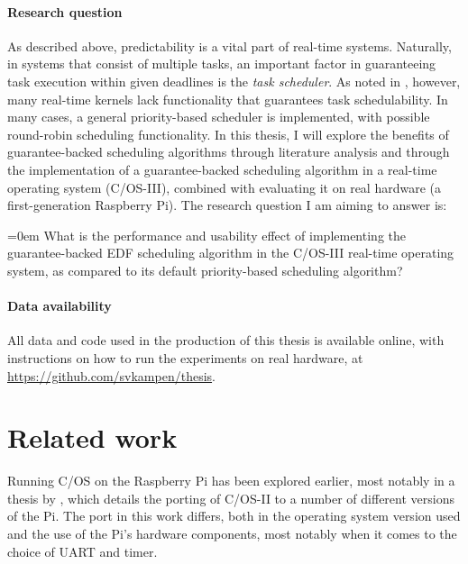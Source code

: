 \documentclass[twoside]{uva-inf-bachelor-thesis}
\newcommand{\ucosiii}{\textmu C/OS-III\xspace}
\newcommand{\ucosii}{\textmu C/OS-II\xspace}
\newcommand{\ucos}{\textmu C/OS\xspace}
\begin{document}
\subsubsection{Research question}
As described above, predictability is a vital part of real-time systems. Naturally, in systems that consist of multiple tasks, an important factor in guaranteeing task execution within given deadlines is the \textit{task scheduler}. As noted in \textcite{buttazzo2011hard}, however, many real-time kernels lack functionality that guarantees task schedulability. In many cases, a general priority-based scheduler is implemented, with possible round-robin scheduling functionality. In this thesis, I will explore the benefits of guarantee-backed scheduling algorithms through literature analysis and through the implementation of a guarantee-backed scheduling algorithm in a real-time operating system (\ucosiii), combined with evaluating it on real hardware (a first-generation Raspberry Pi). The research question I am aiming to answer is:

\begin{outline}
    \itemsep=0em
    \1 What is the performance and usability effect of implementing the guarantee-backed EDF scheduling algorithm in the \ucosiii real-time operating system, as compared to its default priority-based scheduling algorithm?
\end{outline}


\subsubsection{Data availability}
All data and code used in the production of this thesis is available online, with instructions on how to run the experiments on real hardware, at \url{https://github.com/svkampen/thesis}.



%
%
%
%

\chapter{Related work}
Running \ucos on the Raspberry Pi has been explored earlier, most notably in a thesis by \textcite{sfd:realpi}, which details the porting of \ucosii to a number of different versions of the Pi. The port in this work differs, both in the operating system version used and the use of the Pi's hardware components, most notably when it comes to the choice of UART and timer.
\end{document}
